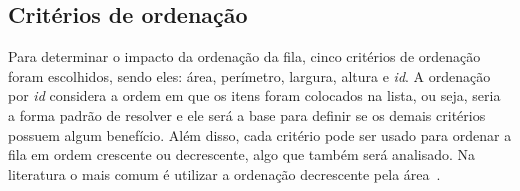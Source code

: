 \subsection{Critérios de ordenação}\label{subsec:criterios-de-ordenacao}

Para determinar o impacto da ordenação da fila, cinco critérios de ordenação
foram escolhidos, sendo eles: área, perímetro, largura, altura e \textit{id}.
A ordenação por \textit{id} considera a ordem em que os itens foram colocados na lista, ou seja,
seria a forma padrão de resolver e ele será a base para definir se os demais critérios possuem
algum benefício.
Além disso, cada critério pode ser usado para ordenar a fila em ordem crescente ou decrescente,
algo que também será analisado.
Na literatura o mais comum é utilizar a ordenação decrescente pela área~\cite{chen2019efficient}.
